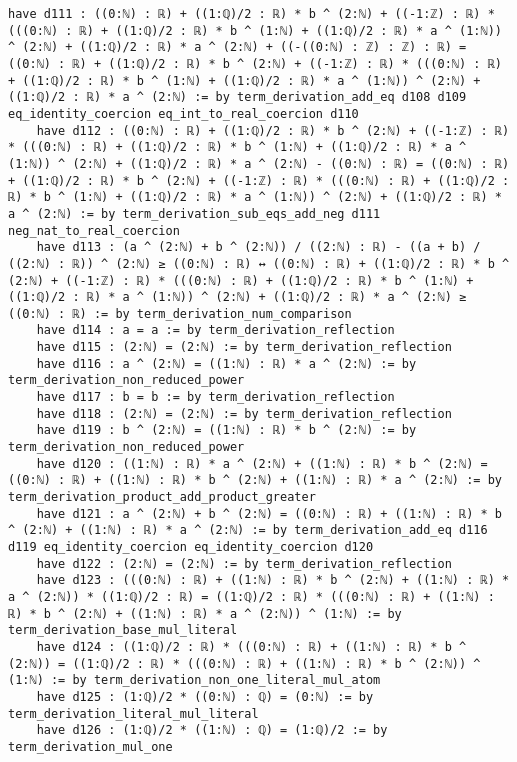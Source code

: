 \documentclass{article}
\begin{document}
\begin{tcolorbox}[colback=white!10, width=\linewidth]
\begin{lstlisting}[language=Lean4]
    have d111 : ((0:ℕ) : ℝ) + ((1:ℚ)/2 : ℝ) * b ^ (2:ℕ) + ((-1:ℤ) : ℝ) * (((0:ℕ) : ℝ) + ((1:ℚ)/2 : ℝ) * b ^ (1:ℕ) + ((1:ℚ)/2 : ℝ) * a ^ (1:ℕ)) ^ (2:ℕ) + ((1:ℚ)/2 : ℝ) * a ^ (2:ℕ) + ((-((0:ℕ) : ℤ) : ℤ) : ℝ) = ((0:ℕ) : ℝ) + ((1:ℚ)/2 : ℝ) * b ^ (2:ℕ) + ((-1:ℤ) : ℝ) * (((0:ℕ) : ℝ) + ((1:ℚ)/2 : ℝ) * b ^ (1:ℕ) + ((1:ℚ)/2 : ℝ) * a ^ (1:ℕ)) ^ (2:ℕ) + ((1:ℚ)/2 : ℝ) * a ^ (2:ℕ) := by term_derivation_add_eq d108 d109 eq_identity_coercion eq_int_to_real_coercion d110
    have d112 : ((0:ℕ) : ℝ) + ((1:ℚ)/2 : ℝ) * b ^ (2:ℕ) + ((-1:ℤ) : ℝ) * (((0:ℕ) : ℝ) + ((1:ℚ)/2 : ℝ) * b ^ (1:ℕ) + ((1:ℚ)/2 : ℝ) * a ^ (1:ℕ)) ^ (2:ℕ) + ((1:ℚ)/2 : ℝ) * a ^ (2:ℕ) - ((0:ℕ) : ℝ) = ((0:ℕ) : ℝ) + ((1:ℚ)/2 : ℝ) * b ^ (2:ℕ) + ((-1:ℤ) : ℝ) * (((0:ℕ) : ℝ) + ((1:ℚ)/2 : ℝ) * b ^ (1:ℕ) + ((1:ℚ)/2 : ℝ) * a ^ (1:ℕ)) ^ (2:ℕ) + ((1:ℚ)/2 : ℝ) * a ^ (2:ℕ) := by term_derivation_sub_eqs_add_neg d111 neg_nat_to_real_coercion
    have d113 : (a ^ (2:ℕ) + b ^ (2:ℕ)) / ((2:ℕ) : ℝ) - ((a + b) / ((2:ℕ) : ℝ)) ^ (2:ℕ) ≥ ((0:ℕ) : ℝ) ↔ ((0:ℕ) : ℝ) + ((1:ℚ)/2 : ℝ) * b ^ (2:ℕ) + ((-1:ℤ) : ℝ) * (((0:ℕ) : ℝ) + ((1:ℚ)/2 : ℝ) * b ^ (1:ℕ) + ((1:ℚ)/2 : ℝ) * a ^ (1:ℕ)) ^ (2:ℕ) + ((1:ℚ)/2 : ℝ) * a ^ (2:ℕ) ≥ ((0:ℕ) : ℝ) := by term_derivation_num_comparison
    have d114 : a = a := by term_derivation_reflection
    have d115 : (2:ℕ) = (2:ℕ) := by term_derivation_reflection
    have d116 : a ^ (2:ℕ) = ((1:ℕ) : ℝ) * a ^ (2:ℕ) := by term_derivation_non_reduced_power
    have d117 : b = b := by term_derivation_reflection
    have d118 : (2:ℕ) = (2:ℕ) := by term_derivation_reflection
    have d119 : b ^ (2:ℕ) = ((1:ℕ) : ℝ) * b ^ (2:ℕ) := by term_derivation_non_reduced_power
    have d120 : ((1:ℕ) : ℝ) * a ^ (2:ℕ) + ((1:ℕ) : ℝ) * b ^ (2:ℕ) = ((0:ℕ) : ℝ) + ((1:ℕ) : ℝ) * b ^ (2:ℕ) + ((1:ℕ) : ℝ) * a ^ (2:ℕ) := by term_derivation_product_add_product_greater
    have d121 : a ^ (2:ℕ) + b ^ (2:ℕ) = ((0:ℕ) : ℝ) + ((1:ℕ) : ℝ) * b ^ (2:ℕ) + ((1:ℕ) : ℝ) * a ^ (2:ℕ) := by term_derivation_add_eq d116 d119 eq_identity_coercion eq_identity_coercion d120
    have d122 : (2:ℕ) = (2:ℕ) := by term_derivation_reflection
    have d123 : (((0:ℕ) : ℝ) + ((1:ℕ) : ℝ) * b ^ (2:ℕ) + ((1:ℕ) : ℝ) * a ^ (2:ℕ)) * ((1:ℚ)/2 : ℝ) = ((1:ℚ)/2 : ℝ) * (((0:ℕ) : ℝ) + ((1:ℕ) : ℝ) * b ^ (2:ℕ) + ((1:ℕ) : ℝ) * a ^ (2:ℕ)) ^ (1:ℕ) := by term_derivation_base_mul_literal
    have d124 : ((1:ℚ)/2 : ℝ) * (((0:ℕ) : ℝ) + ((1:ℕ) : ℝ) * b ^ (2:ℕ)) = ((1:ℚ)/2 : ℝ) * (((0:ℕ) : ℝ) + ((1:ℕ) : ℝ) * b ^ (2:ℕ)) ^ (1:ℕ) := by term_derivation_non_one_literal_mul_atom
    have d125 : (1:ℚ)/2 * ((0:ℕ) : ℚ) = (0:ℕ) := by term_derivation_literal_mul_literal
    have d126 : (1:ℚ)/2 * ((1:ℕ) : ℚ) = (1:ℚ)/2 := by term_derivation_mul_one

\end{lstlisting}
\end{tcolorbox}
\end{document}
